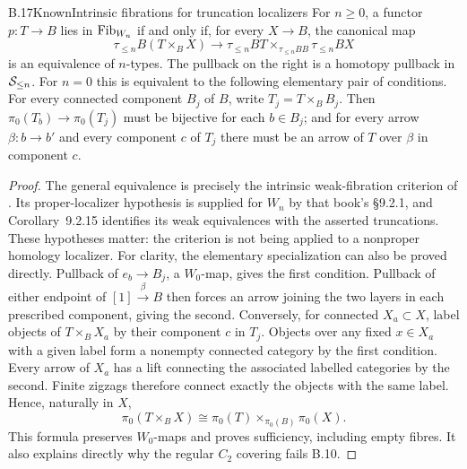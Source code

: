 \begin{claim}{B.17}{Known}{Intrinsic fibrations for truncation localizers}
For $n\geq0$, a functor $p:T\to B$ lies in $\mathrm{Fib}_{W_n}$ if and only if,
for every $X\to B$, the canonical map
\[
 \tau_{\leq n}B(T\times_BX)\longrightarrow
 \tau_{\leq n}BT\times_{\tau_{\leq n}BB}\tau_{\leq n}BX
\]
is an equivalence of $n$-types. The pullback on the right is a homotopy
pullback in $\mathcal S_{\leq n}$.
For $n=0$ this is equivalent to the following elementary pair of conditions.
For every connected component $B_j$ of $B$, write $T_j=T\times_BB_j$.
Then $\pi_0(T_b)\to\pi_0(T_j)$ must be bijective for each $b\in B_j$;
and for every arrow $\beta:b\to b'$ and every component $c$ of $T_j$
there must be an arrow of $T$ over $\beta$ in component $c$.
\end{claim}
\begin{proof}
The general equivalence is precisely the intrinsic weak-fibration criterion
of \citet[Proposition 6.2.3]{BCCisinski2006}. Its proper-localizer
hypothesis is supplied for $W_n$ by that book's \S9.2.1, and
Corollary~9.2.15 identifies its weak equivalences with the asserted
truncations. These hypotheses matter: the criterion is not being applied
to a nonproper homology localizer.
For clarity, the elementary specialization can also be proved directly.
Pullback of $e_b\to B_j$, a $W_0$-map, gives the first condition.
Pullback of either endpoint of $[1]\xrightarrow{\beta}B$ then forces
an arrow joining the two layers in each prescribed component, giving the
second. Conversely, for connected $X_a\subset X$, label objects of
$T\times_BX_a$ by their component $c$ in $T_j$. Objects over any fixed
$x\in X_a$ with a given label form a nonempty connected category by the
first condition. Every arrow of $X_a$ has a lift connecting the associated
labelled categories by the second. Finite zigzags therefore connect exactly
the objects with the same label. Hence, naturally in $X$,
\[
 \pi_0(T\times_BX)\cong\pi_0(T)\times_{\pi_0(B)}\pi_0(X).
\]
This formula preserves $W_0$-maps and proves sufficiency, including empty
fibres. It also explains directly why the regular $C_2$ covering fails B.10.
\end{proof}

